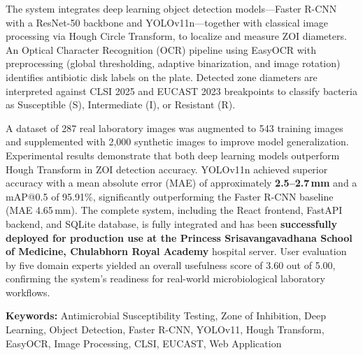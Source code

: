 The system integrates deep learning object detection models---Faster R-CNN with a ResNet-50 backbone and
YOLOv11n---together with classical image processing via Hough Circle Transform, to localize and measure ZOI diameters.
An Optical Character Recognition (OCR) pipeline using EasyOCR with preprocessing (global thresholding,
adaptive binarization, and image rotation) identifies antibiotic disk labels on the plate.
Detected zone diameters are interpreted against CLSI 2025 and EUCAST 2023 breakpoints
to classify bacteria as Susceptible (S), Intermediate (I), or Resistant (R).

A dataset of 287 real laboratory images was augmented to 543 training images and supplemented with 2,000 synthetic images
to improve model generalization.
Experimental results demonstrate that both deep learning models outperform Hough Transform in ZOI detection accuracy.
YOLOv11n achieved superior accuracy with a mean absolute error (MAE) of approximately \textbf{2.5--2.7\,mm}
and a mAP@0.5 of 95.91\%, significantly outperforming the Faster R-CNN baseline (MAE 4.65\,mm).
The complete system, including the React frontend, FastAPI backend, and SQLite database, is fully integrated
and has been \textbf{successfully deployed for production use at the Princess Srisavangavadhana School of Medicine, Chulabhorn Royal Academy} hospital server.
User evaluation by five domain experts yielded an overall usefulness score of 3.60 out of 5.00,
confirming the system's readiness for real-world microbiological laboratory workflows.

\noindent\textbf{Keywords:} Antimicrobial Susceptibility Testing, Zone of Inhibition, Deep Learning, Object Detection,
Faster R-CNN, YOLOv11, Hough Transform, EasyOCR, Image Processing, CLSI, EUCAST, Web Application

\newpage

\clearpage
{}
{}

